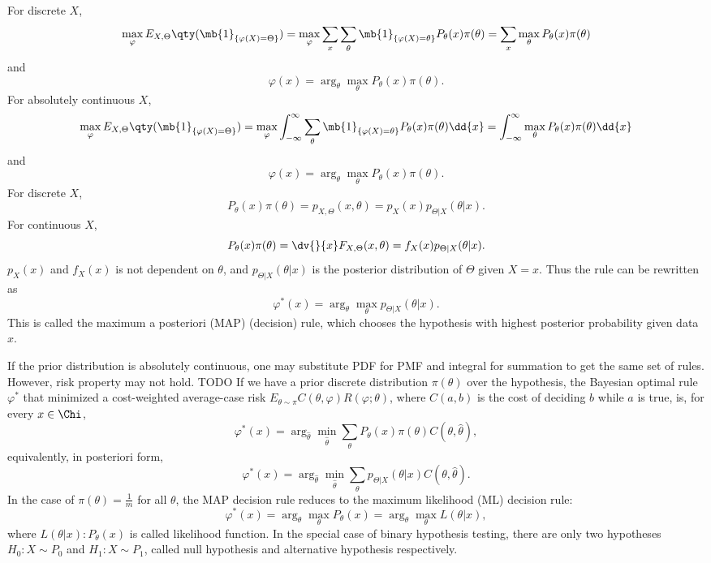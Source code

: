 \documentclass[a4paper,12pt]{report}
\begin{document}
For discrete $X$,
\[\max_{\varphi}E_{X,\Theta}\qty(\mb{1}_{\{\varphi(X)=\Theta\}})=\max_{\varphi}\sum_x\sum_{\theta}\mb{1}_{\{\varphi(X)=\theta\}}P_{\theta}(x)\pi(\theta)=\sum_x\max_{\theta}P_{\theta}(x)\pi(\theta)\]
and
\[\varphi(x)=\arg_{\theta}\max_{\theta}P_{\theta}(x)\pi(\theta).\]
For absolutely continuous $X$,
\[\max_{\varphi}E_{X,\Theta}\qty(\mb{1}_{\{\varphi(X)=\Theta\}})=\max_{\varphi}\int_{-\infty}^{\infty}\sum_{\theta}\mb{1}_{\{\varphi(X)=\theta\}}P_{\theta}(x)\pi(\theta)\dd{x}=\int_{-\infty}^{\infty}\max_{\theta}P_{\theta}(x)\pi(\theta)\dd{x}\]
and
\[\varphi(x)=\arg_{\theta}\max_{\theta}P_{\theta}(x)\pi(\theta).\]
\epr
For discrete $X$,
\[P_{\theta}(x)\pi(\theta)=p_{X,\Theta}(x,\theta)=p_X(x)p_{\Theta|X}(\theta|x).\]
For continuous $X$,
\[P_{\theta}(x)\pi(\theta)=\dv{}{x}F_{X,\Theta}(x,\theta)=f_X(x)p_{\Theta|X}(\theta|x).\]
$p_X(x)$ and $f_X(x)$ is not dependent on $\theta$, and $p_{\Theta|X}(\theta|x)$ is the posterior distribution of $\Theta$ given $X=x$. Thus the rule can be rewritten as
\[\varphi^*(x)=\arg_{\theta}\max_{\theta}p_{\Theta|X}(\theta|x).\]
This is called the maximum a posteriori (MAP) (decision) rule, which chooses the hypothesis with highest posterior probability given data $x$.

If the prior distribution is absolutely continuous, one may substitute PDF for PMF and integral for summation to get the same set of rules. However, risk property may not hold.
TODO
If we have a prior discrete distribution $\pi(\theta)$ over the hypothesis, the Bayesian optimal rule $\varphi^*$ that minimized a cost-weighted average-case risk $E_{\theta\sim\pi}C(\theta,\varphi)R(\varphi;\theta)$, where $C(a,b)$ is the cost of deciding $b$ while $a$ is true, is, for every $x\in\Chi$,
\[\varphi^*(x)=\arg_{\hat{\theta}}\min_{\hat{\theta}}\sum_{\theta}P_{\theta}(x)\pi(\theta)C(\theta,\hat{\theta}),\]
equivalently, in posteriori form,
\[\varphi^*(x)=\arg_{\hat{\theta}}\min_{\hat{\theta}}\sum_{\theta}p_{\Theta|X}(\theta|x)C(\theta,\hat{\theta}).\]
In the case of $\pi(\theta)=\frac{1}{m}$ for all $\theta$, the MAP decision rule reduces to the maximum likelihood (ML) decision rule:
\[\varphi^*(x)=\arg_{\theta}\max_{\theta}P_{\theta}(x)=\arg_{\theta}\max_{\theta}L(\theta|x),\]
where $L(\theta|x)\colon P_{\theta}(x)$ is called likelihood function.
In the special case of binary hypothesis testing, there are only two hypotheses $H_0\colon X\sim P_0$ and $H_1\colon X\sim P_1$, called null hypothesis and alternative hypothesis respectively.
\end{document}
